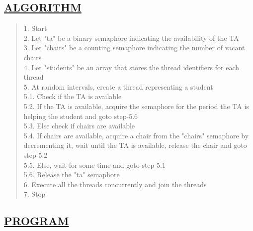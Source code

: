 \documentclass[a4paper, 12pt]{article}
\begin{document}
\subsection*{\underline{ALGORITHM}}
\begin{quote}
1. Start\\
2. Let "ta" be a binary semaphore indicating the availability of the TA\\
3. Let "chairs" be a counting semaphore indicating the number of vacant chairs\\
4. Let "students" be an array that stores the thread identifiers for each thread\\
5. At random intervals, create a thread representing a student\\
\hspace*{1cm} 5.1. Check if the TA is available\\
\hspace*{1cm} 5.2. If the TA is available, acquire the semaphore for the period the TA is helping \hspace*{2cm} the student and goto step-5.6\\
\hspace*{1cm} 5.3. Else check if chairs are available\\
\hspace*{1cm} 5.4. If chairs are available, acquire a chair from the "chairs" semaphore by \hspace*{2cm} decrementing it,  wait until the TA is available, release the chair and goto \hspace*{2cm} step-5.2\\
\hspace*{1cm} 5.5. Else, wait for some time and goto step 5.1\\
\hspace*{1cm} 5.6. Release the "ta" semaphore\\
6. Execute all the threads concurrently and join the threads\\
7. Stop\\
\end{quote}

\subsection*{\underline{PROGRAM}}
\begin{quote}
\inputminted[fontsize=\small,breaklines,breakanywhere]{c}{teaching_assistant_problem.c}
\end{quote}
\end{document}
